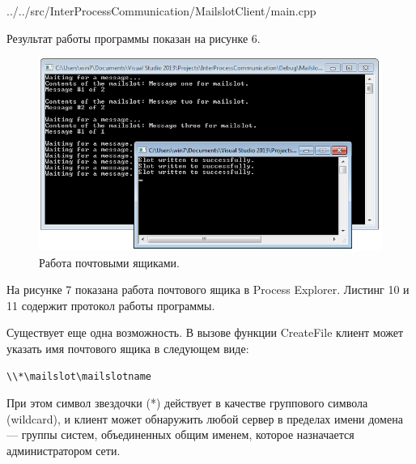 \documentclass[a4paper, 12pt]{report}		%
\begin{document}
\vspace{3em}


{../../src/InterProcessCommunication/MailslotClient/main.cpp}

Результат работы программы показан на рисунке 6.

\begin{figure}[h!]
\centering
\includegraphics[scale=0.95]{res/06_MailSlot}
\caption{Работа почтовыми ящиками.}
\end{figure}

На рисунке 7 показана работа почтового ящика в Process Explorer. Листинг 10 и 11 содержит протокол работы программы.





Существует еще одна возможность. В вызове функции CreateFile клиент может указать имя почтового ящика в следующем виде:

\begin{verbatim}\\*\mailslot\mailslotname
\end{verbatim}

При этом символ звездочки (*) действует в качестве группового символа (wildcard), и клиент может обнаружить любой сервер в пределах имени домена — группы систем, объединенных общим именем, которое назначается администратором сети\cite{Dushutina}. 
\end{document}
